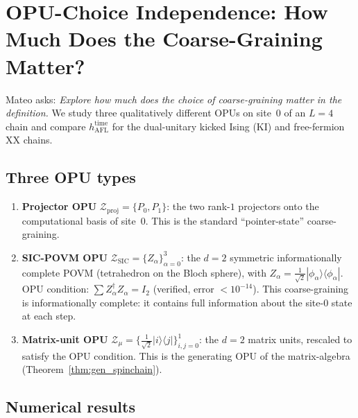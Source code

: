 \documentclass[12pt,a4paper]{article}
\begin{document}
\section{OPU-Choice Independence: How Much Does the Coarse-Graining Matter?}
\label{sec:opu_independence}

Mateo asks: \emph{Explore how much does the choice of coarse-graining matter in the
definition.}  We study three qualitatively different OPUs on site~$0$ of an $L=4$
chain and compare $h_{\mathrm{AFL}}^{\mathrm{time}}$ for the dual-unitary kicked
Ising (KI) and free-fermion XX chains.

\subsection{Three OPU types}

\begin{enumerate}
\item \textbf{Projector OPU} $\mathcal{Z}_{\mathrm{proj}} = \{P_0,P_1\}$:
  the two rank-$1$ projectors onto the computational basis of site~$0$.
  This is the standard ``pointer-state'' coarse-graining.

\item \textbf{SIC-POVM OPU} $\mathcal{Z}_{\mathrm{SIC}} = \{Z_\alpha\}_{\alpha=0}^3$:
  the $d=2$ symmetric informationally complete POVM (tetrahedron on the Bloch
  sphere), with $Z_\alpha = \tfrac{1}{\sqrt{2}}|\phi_\alpha\rangle\langle\phi_\alpha|$.
  OPU condition: $\sum Z_\alpha^\dagger Z_\alpha = I_2$ (verified, error $<10^{-14}$).
  This coarse-graining is informationally complete: it contains full information
  about the site-$0$ state at each step.

\item \textbf{Matrix-unit OPU} $\mathcal{Z}_{\mu} = \{\tfrac{1}{\sqrt{2}}|i\rangle\langle j|\}_{i,j=0}^1$:
  the $d=2$ matrix units, rescaled to satisfy the OPU condition.  This is the
  generating OPU of the matrix-algebra (Theorem~\ref{thm:gen_spinchain}).
\end{enumerate}

\subsection{Numerical results}
\end{document}
